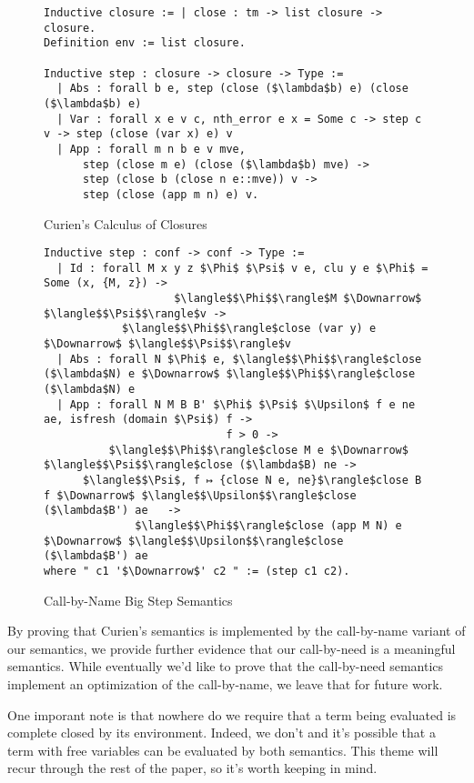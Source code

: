 \begin{figure}
\begin{lstlisting}
Inductive closure := | close : tm -> list closure -> closure. 
Definition env := list closure.

Inductive step : closure -> closure -> Type := 
  | Abs : forall b e, step (close ($\lambda$b) e) (close ($\lambda$b) e)
  | Var : forall x e v c, nth_error e x = Some c -> step c v -> step (close (var x) e) v
  | App : forall m n b e v mve,
      step (close m e) (close ($\lambda$b) mve) ->
      step (close b (close n e::mve)) v ->
      step (close (app m n) e) v.
\end{lstlisting}
\caption{Curien's Calculus of Closures}
\label{fig:curien}
\end{figure}


\begin{figure}
\begin{lstlisting}
Inductive step : conf -> conf -> Type :=
  | Id : forall M x y z $\Phi$ $\Psi$ v e, clu y e $\Phi$ = Some (x, {M, z}) -> 
                    $\langle$$\Phi$$\rangle$M $\Downarrow$ $\langle$$\Psi$$\rangle$v ->
            $\langle$$\Phi$$\rangle$close (var y) e $\Downarrow$ $\langle$$\Psi$$\rangle$v
  | Abs : forall N $\Phi$ e, $\langle$$\Phi$$\rangle$close ($\lambda$N) e $\Downarrow$ $\langle$$\Phi$$\rangle$close ($\lambda$N) e
  | App : forall N M B B' $\Phi$ $\Psi$ $\Upsilon$ f e ne ae, isfresh (domain $\Psi$) f -> 
                            f > 0 ->
          $\langle$$\Phi$$\rangle$close M e $\Downarrow$ $\langle$$\Psi$$\rangle$close ($\lambda$B) ne -> 
      $\langle$$\Psi$, f ↦ {close N e, ne}$\rangle$close B f $\Downarrow$ $\langle$$\Upsilon$$\rangle$close ($\lambda$B') ae   ->
              $\langle$$\Phi$$\rangle$close (app M N) e $\Downarrow$ $\langle$$\Upsilon$$\rangle$close ($\lambda$B') ae
where " c1 '$\Downarrow$' c2 " := (step c1 c2).
\end{lstlisting}
\caption{Call-by-Name Big Step Semantics}
\label{fig:bigstepname}
\end{figure}

By proving that Curien's semantics is implemented by the call-by-name variant of
our semantics, we provide further evidence that our call-by-need is a
meaningful semantics. While eventually we'd like to prove that the call-by-need
semantics implement an optimization of the call-by-name, we leave that for
future work.

One imporant note is that nowhere do we require that a term being evaluated is
complete closed by its environment. Indeed, we don't and it's possible that a
term with free variables can be evaluated by both semantics. This theme will
recur through the rest of the paper, so it's worth keeping in mind.  
